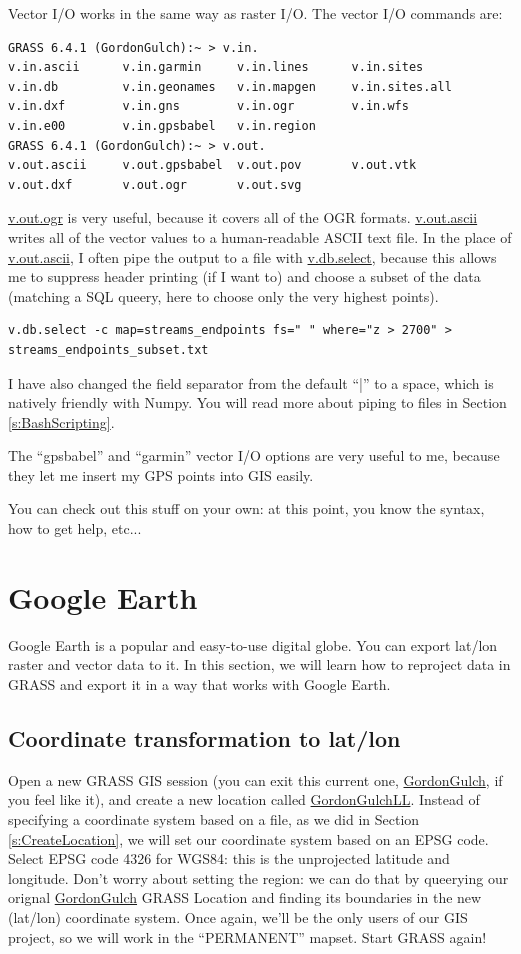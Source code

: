 \documentclass{book}
\begin{document}
Vector I/O works in the same way as raster I/O. The vector I/O commands are:
\begin{lstlisting}
GRASS 6.4.1 (GordonGulch):~ > v.in.
v.in.ascii      v.in.garmin     v.in.lines      v.in.sites
v.in.db         v.in.geonames   v.in.mapgen     v.in.sites.all
v.in.dxf        v.in.gns        v.in.ogr        v.in.wfs
v.in.e00        v.in.gpsbabel   v.in.region     
GRASS 6.4.1 (GordonGulch):~ > v.out.
v.out.ascii     v.out.gpsbabel  v.out.pov       v.out.vtk
v.out.dxf       v.out.ogr       v.out.svg       
\end{lstlisting}
\url{v.out.ogr} is very useful, because it covers all of the OGR formats. \url{v.out.ascii} writes all of the vector values to a human-readable ASCII text file. In the place of \url{v.out.ascii}, I often pipe the output to a file with \url{v.db.select}, because this allows me to suppress header printing (if I want to) and choose a subset of the data (matching a SQL queery, here to choose only the very highest points).
\begin{lstlisting}
v.db.select -c map=streams_endpoints fs=" " where="z > 2700" > streams_endpoints_subset.txt 
\end{lstlisting}
I have also changed the field separator from the default ``|'' to a space, which is natively friendly with Numpy. You will read more about piping to files in Section \ref{s:BashScripting}.

The ``gpsbabel'' and ``garmin'' vector I/O options are very useful to me, because they let me insert my GPS points into GIS easily.

You can check out this stuff on your own: at this point, you know the syntax, how to get help, etc...

\section{Google Earth}

Google Earth is a popular and easy-to-use digital globe. You can export lat/lon raster and vector data to it. In this section, we will learn how to reproject data in GRASS and export it in a way that works with Google Earth.

\subsection{Coordinate transformation to lat/lon}

Open a new GRASS GIS session (you can exit this current one, \url{GordonGulch}, if you feel like it), and create a new location called \url{GordonGulchLL}. Instead of specifying a coordinate system based on a file, as we did in Section \ref{s:CreateLocation}, we will set our coordinate system based on an EPSG code. Select EPSG code 4326 for WGS84: this is the unprojected latitude and longitude. Don't worry about setting the region: we can do that by queerying our orignal \url{GordonGulch} GRASS Location and finding its boundaries in the new (lat/lon) coordinate system. Once again, we'll be the only users of our GIS project, so we will work in the ``PERMANENT'' mapset. Start GRASS again!
\end{document}

